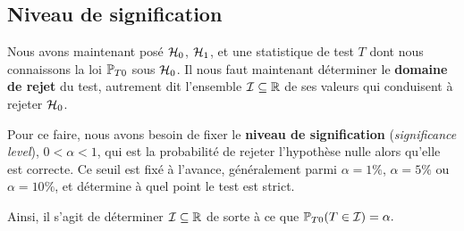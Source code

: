 \subsection{Niveau de signification}
Nous avons maintenant posé $\mathcal{H}_0$, $\mathcal{H}_1$, et une statistique de test $T$
dont nous connaissons la loi $\mathbb{P}_{T0}$ sous $\mathcal{H}_0$. Il nous faut maintenant
déterminer le \textbf{domaine de rejet} du test, autrement dit l'ensemble
$\mathcal{I} \subseteq \mathbb{R}$ de ses valeurs qui conduisent à rejeter $\mathcal{H}_0$.

Pour ce faire, nous avons besoin de fixer le \textbf{niveau de signification}
(\textit{significance level}), $0 < \alpha < 1$, qui est la probabilité de
rejeter l'hypothèse nulle alors qu'elle est correcte. Ce seuil est fixé à
l'avance, généralement parmi $\alpha = 1\%$, $\alpha = 5\%$ ou $\alpha = 10\%$,
et détermine à quel point le test est strict.

Ainsi, il s'agit de déterminer $\mathcal{I} \subseteq \mathbb{R}$ de sorte à ce que
$\mathbb{P}_{T0}(T \in \mathcal{I}) = \alpha.$

